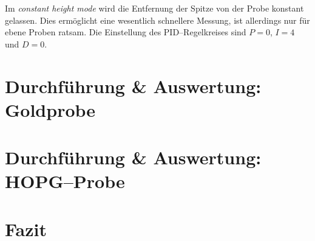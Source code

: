 \documentclass[sn-mathphys-num,iicol]{sn-jnl}
\theoremstyle{thmstyleone}
\theoremstyle{thmstyletwo}
\theoremstyle{thmstylethree}
\begin{document}
Im \textit{constant height mode} wird die Entfernung der Spitze von der Probe konstant gelassen.
Dies ermöglicht eine wesentlich schnellere Messung, ist allerdings nur für ebene Proben ratsam.
Die Einstellung des PID--Regelkreises sind $P=0$, $I=4$ und $D=0$.

\section{Durchführung \& Auswertung:\\Goldprobe}

\section{Durchführung \& Auswertung:\\HOPG--Probe}

\section{Fazit}



\clearpage
\end{document}
